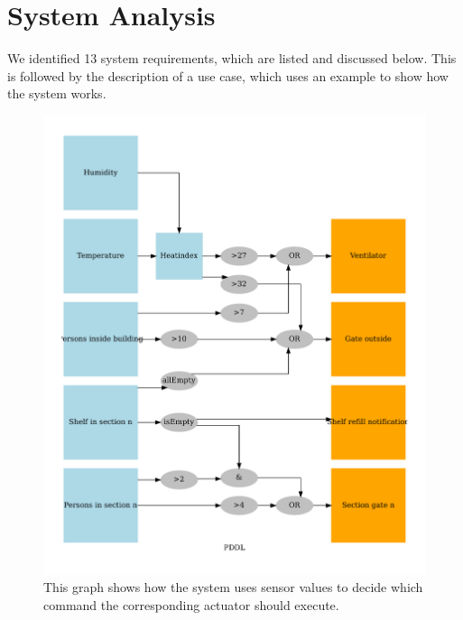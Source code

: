 \documentclass[runningheads]{llncs}
\begin{document}
	\section{System Analysis}
	We identified 13 system requirements, which are listed and discussed below. 
	This is followed by the description of a use case, which uses an example to show how the system works.
	\begin{figure}[h!]
		\centering
		\includegraphics[width=\linewidth]{figures/decision_tree.pdf}
		\caption{This graph shows how the system uses sensor values to decide which command the corresponding actuator should execute.}
		\label{fig:decision}
	\end{figure}
	\clearpage
\end{document}
